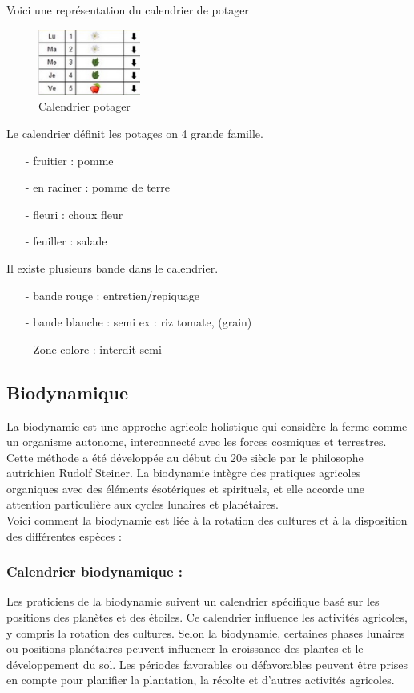 Voici une représentation du calendrier de potager
	\begin{figure}[!h]
    	\center
    		\includegraphics[width=0.3\textwidth]{image/image_de_calendrier_potager2.jpg}
   		\caption{Calendrier potager}
    	\label{calendrier potager}
	\end{figure}
Le calendrier définit les potages on 4 grande famille.
\begin{itemize}
\item[-]fruitier : pomme
\item[-]en raciner : pomme de terre 
\item[-]fleuri : choux fleur
\item[-]feuiller : salade
\end{itemize} 
Il existe plusieurs bande dans le calendrier.
\begin{itemize}
\item[-]bande rouge : entretien/repiquage
\item[-]bande blanche : semi ex : riz tomate, (grain)
\item[-]Zone colore : interdit semi
\end{itemize} 
\subsection{Biodynamique}
La biodynamie est une approche agricole holistique qui considère la ferme comme un organisme autonome, interconnecté avec les forces cosmiques et terrestres. Cette méthode a été développée au début du 20e siècle par le philosophe autrichien Rudolf Steiner. La biodynamie intègre des pratiques agricoles organiques avec des éléments ésotériques et spirituels, et elle accorde une attention particulière aux cycles lunaires et planétaires.\\
Voici comment la biodynamie est liée à la rotation des cultures et à la disposition des différentes espèces :\\
    \subsubsection{Calendrier biodynamique :} Les praticiens de la biodynamie suivent un calendrier spécifique basé sur les positions des planètes et des étoiles. Ce calendrier influence les activités agricoles, y compris la rotation des cultures. Selon la biodynamie, certaines phases lunaires ou positions planétaires peuvent influencer la croissance des plantes et le développement du sol. Les périodes favorables ou défavorables peuvent être prises en compte pour planifier la plantation, la récolte et d'autres activités agricoles.\\
